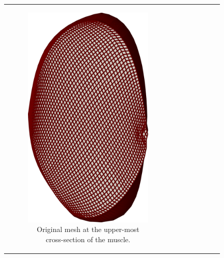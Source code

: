 \begin{figure}
  \centering%
  \begin{tabular}{cc}
    \begin{subfigure}[t]{0.30\textwidth}%
      \centering%
      \includegraphics[width=\textwidth]{images/parallel_fiber_estimation/mesh47_a.png}%
      \caption{Original mesh at the upper-most cross-section of the muscle.}%
      \label{fig:mesh47_a}%
    \end{subfigure}
    &
    \begin{subfigure}[t]{0.30\textwidth}%

\end{subfigure}
\end{tabular}
\end{figure}
